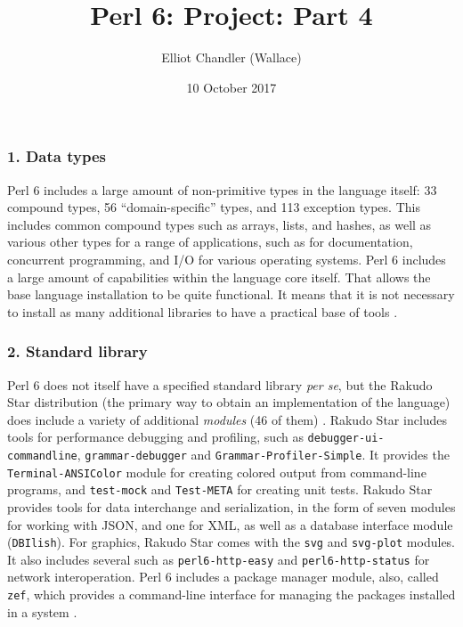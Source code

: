 \documentclass[14pt,english]{extarticle}
\begin{document}
\title{Perl 6: Project: Part 4}


\author{Elliot Chandler (Wallace)}


\date{10 October 2017}

\maketitle

\subsubsection*{1. Data types}

Perl 6 includes a large amount of non-primitive types in the language
itself: 33 compound types, 56 ``domain-specific'' types, and 113
exception types. This includes common compound types such as arrays,
lists, and hashes, as well as various other types for a range of applications,
such as for documentation, concurrent programming, and I/O for various
operating systems. Perl 6 includes a large amount of capabilities
within the language core itself. That allows the base language installation
to be quite functional. It means that it is not necessary to install
as many additional libraries to have a practical base of tools \cite{Documentation}.


\subsubsection*{2. Standard library}

Perl 6 does not itself have a specified standard library \emph{per
se}, but the Rakudo Star distribution (the primary way to obtain an
implementation of the language) does include a variety of additional
\emph{modules} (46 of them) \cite{New1}. Rakudo Star includes tools
for performance debugging and profiling, such as \texttt{debugger-ui-commandline},
\texttt{grammar-debugger} and \texttt{Grammar-Profiler-Simple}. It
provides the \texttt{Terminal-ANSIColor} module for creating colored
output from command-line programs, and \texttt{test-mock} and \texttt{Test-META}
for creating unit tests. Rakudo Star provides tools for data interchange
and serialization, in the form of seven modules for working with JSON,
and one for XML, as well as a database interface module (\texttt{DBIlish}).
For graphics, Rakudo Star comes with the \texttt{svg} and \texttt{svg-plot}
modules. It also includes several such as \texttt{perl6-http-easy}
and \texttt{perl6-http-status} for network interoperation. Perl 6
includes a package manager module, also, called \texttt{zef}, which
provides a command-line interface for managing the packages installed
in a system \cite{New1}.
\end{document}
